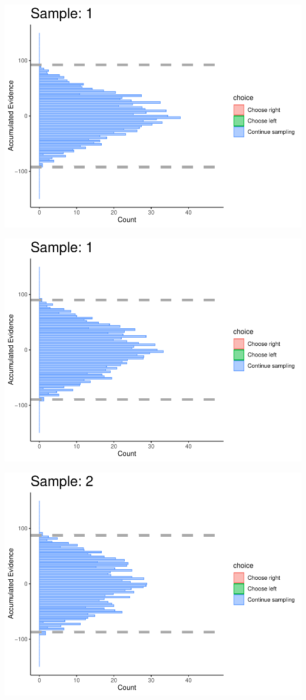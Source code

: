 \documentclass[
]{book}
\begin{document}
\begin{center}\includegraphics[width=0.8\linewidth]{LateNightBayes_files/figure-latex/collapsing_dcb-8} \end{center}

\begin{center}\includegraphics[width=0.8\linewidth]{LateNightBayes_files/figure-latex/collapsing_dcb-9} \end{center}

\begin{center}\includegraphics[width=0.8\linewidth]{LateNightBayes_files/figure-latex/collapsing_dcb-10} \end{center}
\end{document}
